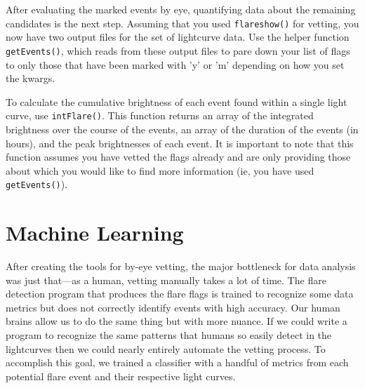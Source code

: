 \documentclass[11pt]{article}
\begin{document}
After evaluating the marked events by eye, quantifying data about the
remaining candidates is the next step.  Assuming that you used
\verb|flareshow()| for vetting, you now have two output files for the
set of lightcurve data.  Use the helper function \verb|getEvents()|,
which reads from these output files to pare down your list of flags to
only those that have been marked with 'y' or 'm' depending on how you
set the kwargs.

To calculate the cumulative brightness of each event found within a
single light curve, use \verb|intFlare()|.  This function returns an
array of the integrated brightness over the course of the events, an
array of the duration of the events (in hours), and the peak
brightnesses of each event.  It is important to note that this
function assumes you have vetted the flags already and are only
providing those about which you would like to find more information
(ie, you have used \verb|getEvents()|).


\section{Machine Learning}
\label{sec:ml}

After creating the tools for by-eye vetting, the major bottleneck for
data analysis was just that---as a human, vetting manually takes a lot
of time.  The flare detection program that produces the flare flags is
trained to recognize some data metrics but does not correctly identify
events with high accuracy.  Our human brains allow us to do the same
thing but with more nuance.  If we could write a program to recognize
the same patterns that humans so easily detect in the lightcurves then
we could nearly entirely automate the vetting process.  To accomplish
this goal, we trained a classifier with a handful of metrics from each
potential flare event and their respective light curves.
\end{document}
